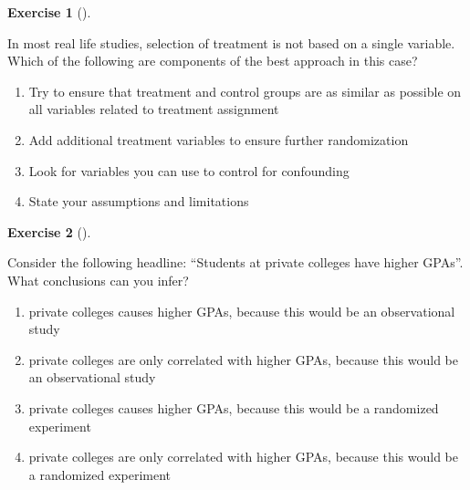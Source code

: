 \documentclass[
  letterpaper,
  DIV=11,
  numbers=noendperiod]{scrreprt}
\providecommand{\tightlist}{%
  \setlength{\itemsep}{0pt}\setlength{\parskip}{0pt}}\usepackage{longtable,booktabs,array}
\theoremstyle{definition}
\newtheorem{exercise}{Exercise}[chapter]
\theoremstyle{remark}
\begin{document}
\begin{exercise}[]\protect\hypertarget{exr-ch07-c05}{}\label{exr-ch07-c05}

In most real life studies, selection of treatment is not based on a
single variable. Which of the following are components of the best
approach in this case?

\begin{enumerate}
\def\labelenumi{\alph{enumi})}
\tightlist
\item
  Try to ensure that treatment and control groups are as similar as
  possible on all variables related to treatment assignment
\item
  Add additional treatment variables to ensure further randomization
\item
  Look for variables you can use to control for confounding
\item
  State your assumptions and limitations
\end{enumerate}

\end{exercise}

\begin{exercise}[]\protect\hypertarget{exr-ch07-c06}{}\label{exr-ch07-c06}

Consider the following headline: ``Students at private colleges have
higher GPAs''. What conclusions can you infer?

\begin{enumerate}
\def\labelenumi{\alph{enumi})}
\tightlist
\item
  private colleges causes higher GPAs, because this would be an
  observational study
\item
  private colleges are only correlated with higher GPAs, because this
  would be an observational study
\item
  private colleges causes higher GPAs, because this would be a
  randomized experiment
\item
  private colleges are only correlated with higher GPAs, because this
  would be a randomized experiment
\end{enumerate}

\end{exercise}
\end{document}
